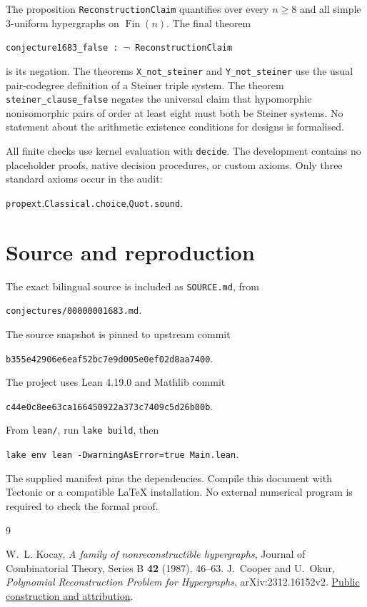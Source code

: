 \documentclass[11pt]{article}
\begin{document}
The proposition \texttt{ReconstructionClaim} quantifies over every
$n\geq8$ and all simple $3$-uniform hypergraphs on $\operatorname{Fin}(n)$.
The final theorem
\begin{center}\texttt{conjecture1683\_false : $\neg$ ReconstructionClaim}
\end{center}
is its negation. The theorems \texttt{X\_not\_steiner} and
\texttt{Y\_not\_steiner} use the usual pair-codegree definition of a
Steiner triple system. The theorem \texttt{steiner\_clause\_false}
negates the universal claim that hypomorphic nonisomorphic pairs of
order at least eight must both be Steiner systems. No statement about
the arithmetic existence conditions for designs is formalised.

All finite checks use kernel evaluation with \texttt{decide}.
The development contains no placeholder proofs, native decision
procedures, or custom axioms. Only three standard axioms occur in the audit:
\begin{center}
\texttt{propext},\quad \texttt{Classical.choice},\quad \texttt{Quot.sound}.
\end{center}

\section*{Source and reproduction}
The exact bilingual source is included as \texttt{SOURCE.md}, from
\begin{center}\small\texttt{conjectures/00000001683.md}.\end{center}
The source snapshot is pinned to upstream commit
\begin{center}\small\texttt{b355e42906e6eaf52bc7e9d005e0ef02d8aa7400}.\end{center}
The project uses Lean 4.19.0 and Mathlib commit
\begin{center}\small\texttt{c44e0c8ee63ca166450922a373c7409c5d26b00b}.\end{center}
From \texttt{lean/}, run \texttt{lake build}, then
\begin{center}\small\texttt{lake env lean -DwarningAsError=true Main.lean}.
\end{center}
The supplied manifest pins the dependencies. Compile this document with
Tectonic or a compatible LaTeX installation. No external numerical
program is required to check the formal proof.

\begin{thebibliography}{9}
\raggedright
{}
W.~L. Kocay, \emph{A family of nonreconstructible hypergraphs},
Journal of Combinatorial Theory, Series B \textbf{42} (1987), 46--63.
J.~Cooper and U.~Okur, \emph{Polynomial Reconstruction Problem for
Hypergraphs}, arXiv:2312.16152v2.
\href{https://arxiv.org/html/2312.16152v2}{Public construction and attribution}.
\end{thebibliography}
\end{document}

